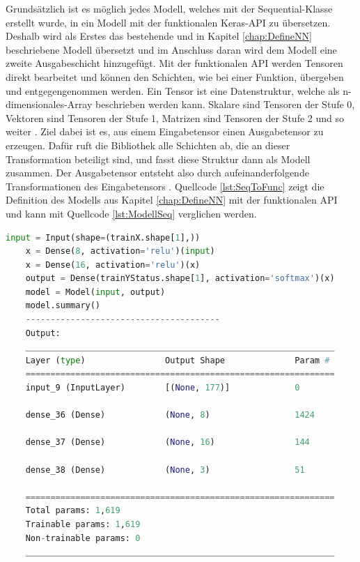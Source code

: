 Grundsätzlich ist es möglich jedes Modell, welches mit der \glqq Sequential\grqq{}-Klasse erstellt wurde, in ein Modell mit der funktionalen Keras-\ac{API} zu übersetzen. 
Deshalb wird als Erstes das bestehende und in Kapitel \ref*{chap:DefineNN} beschriebene Modell übersetzt und im Anschluss daran wird dem Modell eine zweite Ausgabeschicht
hinzugefügt.
Mit der funktionalen \ac{API} werden Tensoren direkt bearbeitet und können den Schichten, wie bei einer Funktion, übergeben und entgegengenommen werden. Ein Tensor ist eine
Datenstruktur, welche als n-dimensionales-Array beschrieben werden kann. Skalare sind Tensoren der Stufe 0, Vektoren sind Tensoren der Stufe 1, Matrizen sind Tensoren
der Stufe 2 und so weiter \cite[vgl. S.128]{AI_Huawei}. Ziel dabei ist es, 
aus einem Eingabetensor einen Ausgabetensor zu erzeugen. Dafür ruft die Bibliothek alle Schichten ab, die an dieser Transformation beteiligt sind, und fasst diese Struktur
dann als Modell zusammen. Der Ausgabetensor entsteht also durch aufeinanderfolgende Transformationen des Eingabetensors \cite[vgl. S.305]{DL_PY}. 
Quellcode \ref*{lst:SeqToFunc} zeigt die Definition des Modells aus Kapitel \ref*{chap:DefineNN} mit der funktionalen \ac{API} und kann mit Quellcode \ref*{lst:ModellSeq}
verglichen werden. 

\begin{lstlisting}[language = python, caption={Modell mit funktionaler \acs{API} darstellen},captionpos=b, label = lst:SeqToFunc, floatplacement=H]
    input = Input(shape=(trainX.shape[1],))
    x = Dense(8, activation='relu')(input)
    x = Dense(16, activation='relu')(x)
    output = Dense(trainYStatus.shape[1], activation='softmax')(x)
    model = Model(input, output)
    model.summary()
    ---------------------------------------
    Output:
    ______________________________________________________________
    Layer (type)                Output Shape              Param #   
    ==============================================================
    input_9 (InputLayer)        [(None, 177)]             0         
                                                                    
    dense_36 (Dense)            (None, 8)                 1424      
                                                                    
    dense_37 (Dense)            (None, 16)                144       
                                                                    
    dense_38 (Dense)            (None, 3)                 51        
                                                                    
    ==============================================================
    Total params: 1,619
    Trainable params: 1,619
    Non-trainable params: 0
    ______________________________________________________________

\end{lstlisting}

